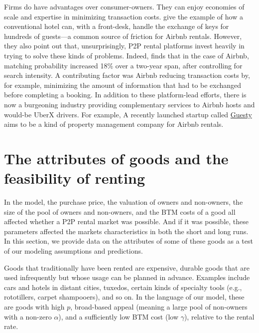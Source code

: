 \documentclass[11pt]{article}
\begin{document}
Firms do have advantages over consumer-owners.
They can enjoy economies of scale and expertise in minimizing transaction costs.
\cite{edelman2015efficiencies} give the example of how a conventional hotel can, with a front-desk, handle the exchange of keys for hundreds of guests---a common source of friction for Airbnb rentals.
However, they also point out that, unsurprisingly, P2P rental platforms invest heavily in trying to solve these kinds of problems. 
Indeed, \cite{fradkin2012online} finds that in the case of Airbnb, matching probability increased 18\% over a two-year span, after controlling for search intensity.
A contributing factor was Airbnb reducing transaction costs by, for example, minimizing the amount of information that had to be exchanged before completing a booking.
In addition to these platform-lead efforts, there is now a burgeoning industry providing complementary services to Airbnb hosts and would-be UberX drivers.  
For example, A recently launched startup called \href{https://www.guesty.com/}{Guesty} aims to be a kind of property management company for Airbnb rentals.

\section{The attributes of goods and the feasibility of renting} \label{sec:empirics} 

In the model, the purchase price, the valuation of owners and non-owners, the size of the pool of owners and non-owners, and the BTM costs of a good all affected whether a P2P rental market was possible.
And if it was possible, these parameters affected the markets
characteristics in both the short and long runs. 
In this section, we provide data on the attributes of some of these goods as a test of our modeling assumptions and predictions.  

Goods that traditionally have been rented are expensive, durable goods that are used infrequently but whose usage can be planned in advance.
Examples include cars and hotels in distant cities, tuxedos, certain kinds of specialty tools (e.g., rototillers, carpet shampooers), and so on.
In the language of our model, these are goods with high $p$, broad-based appeal (meaning a large pool of non-owners with a non-zero $\alpha$), and a sufficiently low BTM cost (low $\gamma$), relative to the rental rate. 
\end{document}
